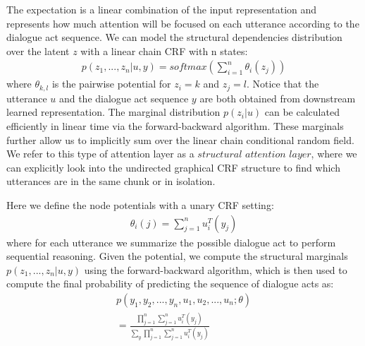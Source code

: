 \documentclass[sigconf]{acmart}
\begin{document}
The expectation is a linear combination of the input representation and represents how much attention will be focused on each utterance according to the dialogue act sequence. We can model the structural dependencies distribution over the latent $z$ with a linear chain CRF with n states:
\begin{align*}
	p(z_1,...,z_n|u,y)=softmax(\sum_{i=1}^{n} \theta_{i}(z_j)) \tag{8}
\end{align*}
where $\theta_{k,l}$ is the pairwise potential for $z_i=k$ and $z_{j}=l$. Notice that the utterance $u$ and the dialogue act sequence $y$ are both obtained from downstream learned representation. The marginal distribution $p(z_i|u)$ can be calculated efficiently in linear time via the forward-backward algorithm. These marginals further allow us to implicitly sum over the linear chain conditional random field. We refer to this type of attention layer as a $structural$ $attention$ $layer$, where we can explicitly look into the undirected graphical CRF structure to find which utterances are in the same chunk or in isolation. 

Here we define the node potentials with a unary CRF setting:
\begin{align*}
	\theta_{i}(j)=\sum_{j=1}^{n}u_i^T(y_j) \tag{9}
\end{align*}
where for each utterance we summarize the possible dialogue act to perform sequential reasoning. Given the potential, we compute the structural marginals $p(z_1,...,z_n|u,y)$ using the forward-backward algorithm, which is then used to compute the final probability of predicting the sequence of dialogue acts as:
\begin{align*}
	p(y_1,y_2,...,y_n, u_1,u_2,...,u_n;\theta)\\
	=\frac{\prod_{j=1}^n\sum_{j=1}^{n}u_i^T(y_j)}{\sum_{y}\prod_{j=1}^n\sum_{j=1}^{n}u_i^T(y_j)} \tag{10}
\end{align*}
\end{document}
